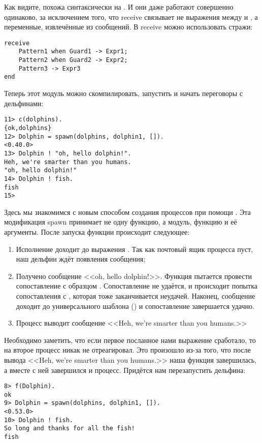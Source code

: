 Как видите,  похожа синтаксически на .
И они даже работают совершенно одинаково, за исключением того, что receive связывает не выражения между  и , а переменные, извлечённые из сообщений.
В receive можно использовать стражи:
\begin{lstlisting}[style=erlang]
receive
    Pattern1 when Guard1 -> Expr1;
    Pattern2 when Guard2 -> Expr2;
    Pattern3 -> Expr3
end
\end{lstlisting}

Теперь этот модуль можно скомпилировать, запустить и начать переговоры с дельфинами:
\begin{lstlisting}[style=erlang]
11> c(dolphins).
{ok,dolphins}
12> Dolphin = spawn(dolphins, dolphin1, []).
<0.40.0>
13> Dolphin ! "oh, hello dolphin!".
Heh, we're smarter than you humans.
"oh, hello dolphin!"
14> Dolphin ! fish.               
fish
15>
\end{lstlisting}

Здесь мы знакомимся с новым способом создания процессов при помощи .
Эта модификация spawn принимает не одну функцию, а модуль, функцию и её аргументы.
После запуска функции происходит следующее:
\begin{enumerate}
    \item Исполнение доходит до выражения .
Так как почтовый ящик процесса пуст, наш дельфин ждёт появления сообщения;
\item Получено сообщение <<oh, hello dolphin!>>.
Функция пытается провести сопоставление с образцом .
Сопоставление не удаётся, и происходит попытка сопоставления с , которая тоже заканчивается неудачей.
Наконец, сообщение доходит до универсального шаблона (\ops{\strut\_}) и сопоставление завершается удачно.
\item Процесс выводит сообщение <<Heh, we're smarter than you humans.>>
\end{enumerate}

Необходимо заметить, что если первое посланное нами выражение сработало, то на второе процесс  никак не отреагировал.
Это произошло из\--за того, что после вывода <<Heh, we're smarter than you humans.>> наша функция завершилась, а вместе с ней завершился и процесс.
Придётся нам перезапустить дельфина:
\begin{lstlisting}[style=erlang]
8> f(Dolphin).   
ok
9> Dolphin = spawn(dolphins, dolphin1, []).
<0.53.0>
10> Dolphin ! fish.
So long and thanks for all the fish!
fish
\end{lstlisting}

